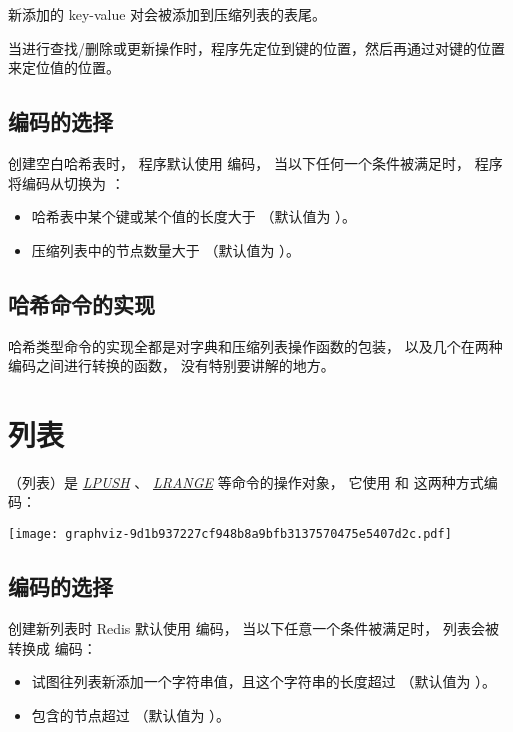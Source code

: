 \documentclass[a4paper,11pt,english]{sphinxmanual}
\begin{document}
新添加的 key-value 对会被添加到压缩列表的表尾。

当进行查找/删除或更新操作时，程序先定位到键的位置，然后再通过对键的位置来定位值的位置。


\subsection{编码的选择}
\label{datatype/hash:id4}
创建空白哈希表时，
程序默认使用  编码，
当以下任何一个条件被满足时，
程序将编码从切换为  ：
\begin{itemize}
\item {} 
哈希表中某个键或某个值的长度大于  （默认值为  ）。

\item {} 
压缩列表中的节点数量大于  （默认值为  ）。

\end{itemize}


\subsection{哈希命令的实现}
\label{datatype/hash:id5}
哈希类型命令的实现全都是对字典和压缩列表操作函数的包装，
以及几个在两种编码之间进行转换的函数，
没有特别要讲解的地方。


\section{列表}
\label{datatype/list:list-chapter}\label{datatype/list::doc}\label{datatype/list:id1}
 （列表）是 \href{http://redis.readthedocs.org/en/latest/list/lpush.html\#lpush}{\emph{LPUSH}} 、 \href{http://redis.readthedocs.org/en/latest/list/lrange.html\#lrange}{\emph{LRANGE}} 等命令的操作对象，
它使用  和  这两种方式编码：

\texttt{[image: graphviz-9d1b937227cf948b8a9bfb3137570475e5407d2c.pdf]}


\subsection{编码的选择}
\label{datatype/list:id2}
创建新列表时 Redis 默认使用  编码，
当以下任意一个条件被满足时，
列表会被转换成  编码：
\begin{itemize}
\item {} 
试图往列表新添加一个字符串值，且这个字符串的长度超过  （默认值为  ）。

\item {} 
 包含的节点超过  （默认值为  ）。

\end{itemize}
\end{document}
